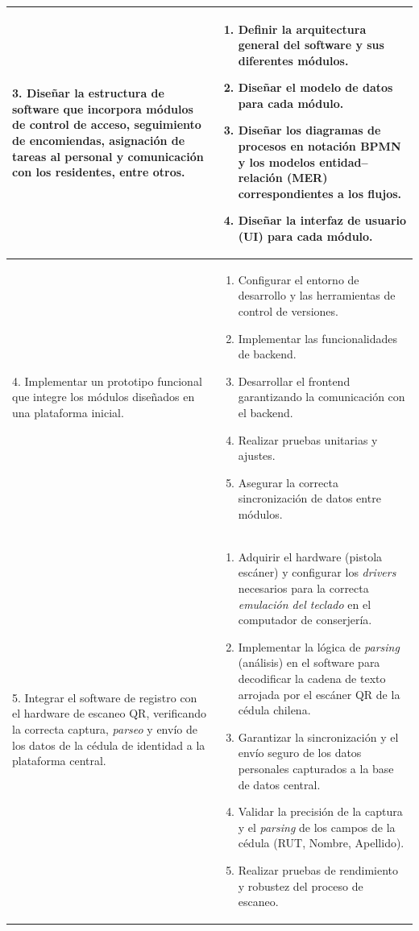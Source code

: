 \begin{longtable}{|p{}|p{}|}
3. Diseñar la estructura de software que incorpora módulos de control de acceso, seguimiento de encomiendas, asignación de tareas al personal y comunicación con los residentes, entre otros. &
\begin{enumerate}
    \item Definir la arquitectura general del software y sus diferentes módulos.
    \item Diseñar el modelo de datos para cada módulo.
    \item Diseñar los diagramas de procesos en notación BPMN y los modelos entidad–relación (MER) correspondientes a los flujos.
    \item Diseñar la interfaz de usuario (UI) para cada módulo.
\end{enumerate}
\\ \hline

4. Implementar un prototipo funcional que integre los módulos diseñados en una plataforma inicial. &
\begin{enumerate}
    \item Configurar el entorno de desarrollo y las herramientas de control de versiones.
    \item Implementar las funcionalidades de backend.
    \item Desarrollar el frontend garantizando la comunicación con el backend.
    \item Realizar pruebas unitarias y ajustes.
    \item Asegurar la correcta sincronización de datos entre módulos.
\end{enumerate}
\\ \hline

5. Integrar el software de registro con el hardware de escaneo QR, verificando la correcta captura, \textit{parseo} y envío de los datos de la cédula de identidad a la plataforma central. &
\begin{enumerate}
    \item Adquirir el hardware (pistola escáner) y configurar los \textit{drivers} necesarios para la correcta \textit{emulación del teclado} en el computador de conserjería.
    \item Implementar la lógica de \textit{parsing} (análisis) en el software para decodificar la cadena de texto arrojada por el escáner QR de la cédula chilena.
    \item Garantizar la sincronización y el envío seguro de los datos personales capturados a la base de datos central.
    \item Validar la precisión de la captura y el \textit{parsing} de los campos de la cédula (RUT, Nombre, Apellido).
    \item Realizar pruebas de rendimiento y robustez del proceso de escaneo.
\end{enumerate}
\\ \hline


\end{longtable}
